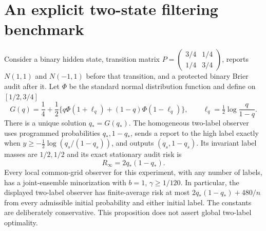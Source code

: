 \section{An explicit two-state filtering benchmark}\label{sec:benchmark}
\begin{proposition}\label{prop:benchmark}
Consider a binary hidden state, transition matrix
$P=\left(\begin{smallmatrix}3/4&1/4\\1/4&3/4\end{smallmatrix}\right)$,
reports $N(1,1)$ and $N(-1,1)$ before that transition, and a protected binary Brier audit after it. Let $\Phi$ be the standard normal distribution function and define on $[1/2,3/4]$
\begin{equation}\label{eq:binary-fixed}
 G(q)=\frac14+\frac12\{q\Phi(1+\ell_q)+(1-q)\Phi(1-\ell_q)\},
 \qquad \ell_q=\tfrac12\log\frac q{1-q}.
\end{equation}
There is a unique solution $q_*=G(q_*)$. The homogeneous two-label observer uses programmed probabilities $q_*,1-q_*$, sends a report to the high label exactly when $y\ge-\frac12\log(q_s/(1-q_s))$, and outputs $(q_s,1-q_s)$. Its invariant label masses are $1/2,1/2$ and its exact stationary audit risk is
\begin{equation}\label{eq:binary-risk}
 R_\infty=2q_*(1-q_*).
\end{equation}
Every local common-grid observer for this experiment, with any number of labels, has a joint-ensemble minorization with $b=1$, $\gamma\ge1/120$. In particular, the displayed two-label observer has finite-average risk at most $2q_*(1-q_*)+480/n$ from every admissible initial probability and either initial label. The constants are deliberately conservative. This proposition does not assert global two-label optimality.
\end{proposition}
